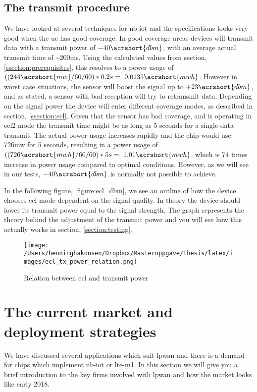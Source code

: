 \documentclass[USenglish]{ifimaster}  %
\begin{document}
\subsection{The transmit procedure} \label{ssection:transmitprocedure}
We have looked at several techniques for \acrshort{nb-iot} and the specifications looks very good when the \acrshort{ue} has good coverage. In good coverage areas devices will transmit data with a transmit power of ${-40 \acrshort{dbm}}$, with an average actual transmit time of \textasciitilde200ms. Using the calculated values from section, \vref{ssection:prerequisites}, this resolves to a power usage of ${((244 \acrshort{mw} / 60 / 60) * 0.2s = ~0.0135 \acrshort{mwh}}$. However in worst case situations, the sensor will boost the signal up to ${+23 \acrshort{dbm}}$, and as stated, a sensor with bad reception will try to retransmit data. Depending on the signal power the device will enter different coverage modes, as described in section, \vref{ssection:ecl}. Given that the sensor has bad coverage, and is operating in \acrshort{ecl}2 mode the transmit time might be as long as 5 seconds for a single data transmit.
The actual power usage increases rapidly and the chip would use 726\acrshort{mw} for 5 seconds, resulting in a power usage of ${((726 \acrshort{mwh} / 60 / 60) * 5s = ~1.01 \acrshort{mwh}}$, which is 74 times increase in power usage compared to optimal conditions. However, as we will see in our tests, ${-40 \acrshort{dbm}}$ is normally not possible to achieve.

In the following figure, \vref{figure:ecl_dbm}, we see an outline of how the device chooses \acrshort{ecl} mode dependent on the signal quality. In theory the device should lower its transmit power equal to the signal strength. The graph represents the theory behind the adjustment of the transmit power and you will see how this actually works in section, \vref{section:testing}.


\begin{figure}[H]
  \centering\texttt{[image: /Users/henninghakonsen/Dropbox/Masteroppgave/thesis/latex/images/ecl\_tx\_power\_relation.png]}
  \caption[\acrshort{ecl} and transmit power relation]{Relation between \acrshort{ecl} and transmit power}
  \label{figure:ecl_dbm}
\end{figure}

\section{The current market and deployment strategies} \label{section:market}
We have discussed several applications which suit \acrshort{lpwan} and there is a demand for chips which implement \acrshort{nb-iot} or \acrshort{lte-m1}. In this section we will give you a brief introduction to the key firms involved with \acrshort{lpwan} and how the market looks like early 2018.
\end{document}
